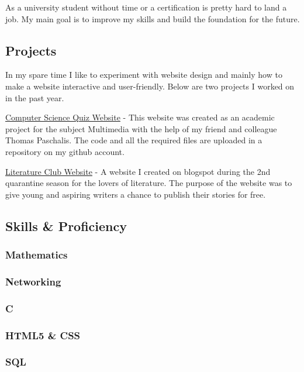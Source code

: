 \documentclass[english,]{article}
\begin{document}
As a university student without time or a certification is pretty hard
to land a job. My main goal is to improve my skills and build the
foundation for the future.

\hypertarget{projects}{%
\subsection{\texorpdfstring{{ \emph{} \emph{} }
Projects}{    Projects}}\label{projects}}

In my spare time I like to experiment with website design and mainly how
to make a website interactive and user-friendly. Below are two projects
I worked on in the past year.

{ \href{https://quiz-pliroforikis.netlify.app/index.html}{Computer
Science Quiz Website} } - {This website was created as an academic
project for the subject Multimedia with the help of my friend and
colleague Thomas Paschalis. The code and all the required files are
uploaded in a repository on my github account.}

{
\href{https://lesxi-logotexnias.blogspot.com/p/home_12.html}{Literature
Club Website} } - {A website I created on blogspot during the 2nd
quarantine season for the lovers of literature. The purpose of the
website was to give young and aspiring writers a chance to publish their
stories for free.}

\hypertarget{skills-proficiency}{%
\subsection{\texorpdfstring{{ \emph{} \emph{} } Skills \&
Proficiency}{    Skills \& Proficiency}}\label{skills-proficiency}}

\hypertarget{mathematics}{%
\subsubsection{Mathematics}\label{mathematics}}

\hypertarget{networking}{%
\subsubsection{Networking}\label{networking}}

\hypertarget{c}{%
\subsubsection{C}\label{c}}

\hypertarget{html5-css}{%
\subsubsection{HTML5 \& CSS}\label{html5-css}}

\hypertarget{sql}{%
\subsubsection{SQL}\label{sql}}

{}
\end{document}
